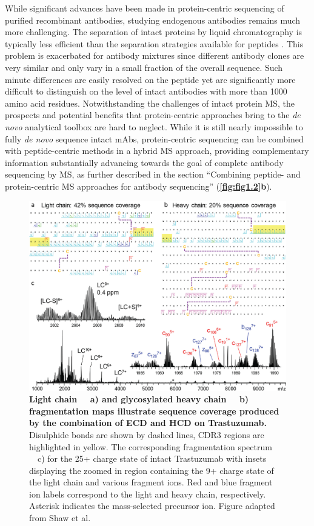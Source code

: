 While significant advances have been made in protein-centric sequencing of purified recombinant antibodies, studying endogenous antibodies remains much more challenging. The separation of intact proteins by liquid chromatography is typically less efficient than the separation strategies available for peptides \cite{shen2017high-resolution}. This problem is exacerbated for antibody mixtures since different antibody clones are very similar and only vary in a small fraction of the overall sequence. Such minute differences are easily resolved on the peptide yet are significantly more difficult to distinguish on the level of intact antibodies with more than 1000 amino acid residues. Notwithstanding the challenges of intact protein MS, the prospects and potential benefits that protein-centric approaches bring to the \emph{de novo} analytical toolbox are hard to neglect. While it is still nearly impossible to fully \emph{de novo} sequence intact mAbs, protein-centric sequencing can be combined with peptide-centric methods in a hybrid MS approach, providing complementary information substantially advancing towards the goal of complete antibody sequencing by MS, as further described in the section “Combining peptide- and protein-centric MS approaches for antibody sequencing” (\textbf{\autoref{fig:fig1.2}b}).
\begin{figure}[!htb]
  \center
  \includegraphics[]{Chapter.1/Figures/f5.png}
  \caption{
    \textbf{Light chain ~~a) and glycosylated heavy chain ~~b) fragmentation maps illustrate sequence coverage produced by the combination of ECD and HCD on Trastuzumab.} Disulphide bonds are shown by dashed lines, CDR3 regions are highlighted in yellow. The corresponding fragmentation spectrum ~~c) for the 25+ charge state of intact Trastuzumab with insets displaying the zoomed in region containing the 9+ charge state of the light chain and various fragment ions. Red and blue fragment ion labels correspond to the light and heavy chain, respectively. Asterisk indicates the mass-selected precursor ion. Figure adapted from Shaw et al. \cite{shaw2020direct}
  }
  \label{fig:fig1.5}
\end{figure}


